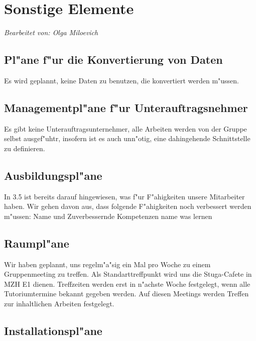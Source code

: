 \section{Sonstige Elemente}

\textit{Bearbeitet von: Olga Miloevich}\\

\subsection{Pl"ane f"ur die Konvertierung von Daten}
Es wird geplannt, keine Daten zu benutzen, die konvertiert werden m"ussen.

\subsection{Managementpl"ane f"ur Unterauftragsnehmer}
Es gibt keine Unterauftragsunternehmer, alle Arbeiten werden von der Gruppe selbst ausgef"uhtr, insofern ist es auch unn"otig, eine dahingehende Schnittstelle zu definieren.

\subsection{Ausbildungspl"ane}
In 3.5 ist bereits darauf hingewiesen, was f"ur F"ahigkeiten unsere Mitarbeiter haben. Wir gehen davon aus, dass folgende F"ahigkeiten noch verbessert werden m"ussen:
Name  und Zuverbessernde Kompetenzen
name    was lernen

\subsection{Raumpl"ane}
Wir haben geplannt, uns regelm"a"sig ein Mal pro Woche zu einem Gruppenmeeting zu treffen. Als Standarttreffpunkt wird uns die Stuga-Cafete in MZH E1 dienen. Treffzeiten werden erst in n"achste Woche festgelegt, wenn alle Tutoriumtermine bekannt gegeben werden. Auf diesen Meetings werden Treffen zur inhaltlichen Arbeiten festgelegt. 

\subsection{Installationspl"ane}

